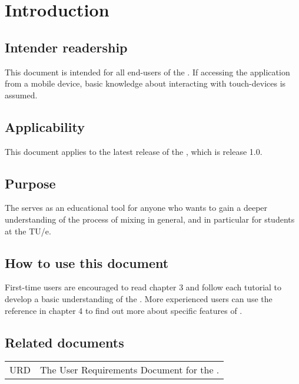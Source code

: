 \chapter{Introduction}

\section{Intender readership}
This document is intended for all end-users of the \applicationname{}. If accessing the application from a mobile device, basic knowledge about interacting with touch-devices is assumed.

\section{Applicability}
This document applies to the latest release of the \applicationname{}, which is release 1.0.

\section{Purpose}
The \applicationname{} serves as an educational tool for anyone who wants to gain a deeper understanding of the process of mixing in general, and in particular for students at the TU/e.

\section{How to use this document}
First-time users are encouraged to read chapter 3 and follow each tutorial to develop a basic understanding of the \applicationname{}. 
More experienced users can use the reference in chapter 4 to find out more about specific features of \projectname{}.

\section{Related documents}
\begin{tabular}{l l}
URD & The User Requirements Document for the \applicationname{}.\\
\end{tabular}

